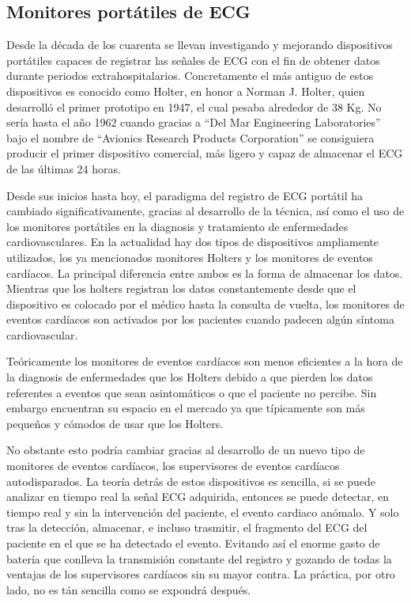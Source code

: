 \subsection{Monitores portátiles de ECG}

Desde la década de los cuarenta se llevan investigando y mejorando dispositivos portátiles capaces de registrar las señales de ECG con el fin de obtener datos durante periodos extrahospitalarios. Concretamente el más antiguo de estos dispositivos es conocido como Holter, en honor a Norman J. Holter, quien desarrolló el primer prototipo en 1947, el cual pesaba alrededor de 38 Kg. No sería hasta el año 1962 cuando gracias a “Del Mar Engineering Laboratories” bajo el nombre de “Avionics Research Products Corporation” se consiguiera producir el primer dispositivo comercial, más ligero y capaz de almacenar el ECG de las últimas 24 horas. \cite{NormanHolter}

Desde sus inicios hasta hoy, el paradigma del registro de ECG portátil ha cambiado significativamente, gracias al desarrollo de la técnica, así como el uso de los monitores portátiles en la diagnosis y tratamiento de enfermedades cardiovasculares. En la actualidad hay dos tipos de dispositivos ampliamente utilizados, los ya mencionados monitores Holters y los monitores de eventos cardíacos. La principal diferencia entre ambos es la forma de almacenar los datos. Mientras que los holters registran los datos constantemente desde que el dispositivo es colocado por el médico hasta la consulta de vuelta, los monitores de eventos cardíacos son activados por los pacientes cuando padecen algún síntoma cardiovascular.

Teóricamente los monitores de eventos cardíacos son menos eficientes a la hora de la diagnosis de enfermedades que los Holters debido a que pierden los datos referentes a eventos que sean asintomáticos o que el paciente no percibe. Sin embargo encuentran su espacio en el mercado ya que típicamente son más pequeños y cómodos de usar que los Holters.

No obstante esto podría cambiar gracias al desarrollo de un nuevo tipo de monitores de eventos cardíacos, los supervisores de eventos cardíacos autodisparados. La teoría detrás de estos dispositivos es sencilla, si se puede analizar en tiempo real la señal ECG adquirida, entonces se puede detectar, en tiempo real y sin la intervención del paciente, el evento cardiaco anómalo. Y solo tras la detección, almacenar, e incluso trasmitir, el fragmento del ECG del paciente en el que se ha detectado el evento. Evitando así el enorme gasto de batería que conlleva la transmisión constante del registro y gozando de todas la ventajas de los supervisores cardíacos sin su mayor contra. La práctica, por otro lado, no es tán sencilla como se expondrá después.

